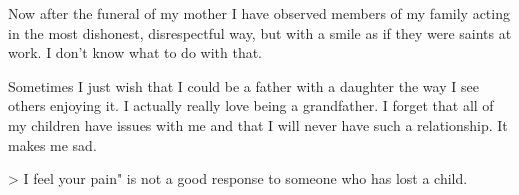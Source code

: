 \documentclass[]{article}
\begin{document}
Now after the funeral of my mother I have observed members of my family acting in the most dishonest, disrespectful way, but with a smile as if they were saints at work. I don't know what to do with that.

Sometimes I just wish that I could be a father with a daughter the way I see others enjoying it. I actually really love being a grandfather. I forget that all of my children have issues with me and that I will never have such a relationship. It makes me sad.

\textgreater{} I feel your pain" is not a good response to someone who has lost a child.
\end{document}
